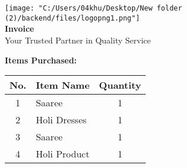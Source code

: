 \documentclass{article}
\begin{document}
        \begin{center}
            \texttt{[image: "C:/Users/04khu/Desktop/New folder (2)/backend/files/logopng1.png"]} \\[0.5em]  
            {\Large \textbf{Invoice}} \\[0.5em]
            {\small Your Trusted Partner in Quality Service}
        \end{center}

        \vspace{1em}

        \color{textgray}
        \noindent
        
        \vspace{2em}

        \textbf{Items Purchased:} \\[1em]

        \renewcommand{\arraystretch}{1.3} %
        \begin{tabular}{|c|l|c|}
            \rowcolor{headerblue} %
            \hline
            \textbf{No.} & \textbf{Item Name} & \textbf{Quantity} \\
            \hline
            1 & Saaree & 1 \\ \hline
2 & Holi Dresses & 1 \\ \hline
3 & Saaree & 1 \\ \hline
4 & Holi Product & 1 \\ \hline
        \end{tabular}

        \vspace{2em}
\end{document}
